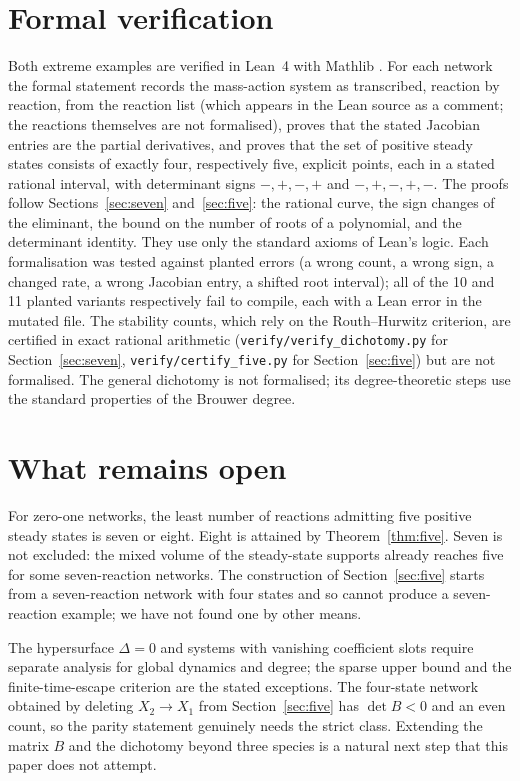 \documentclass[11pt]{article}
\theoremstyle{remark}\newtheorem{remark}[theorem]{Remark}
\begin{document}
\section{Formal verification}
Both extreme examples are verified in Lean~4 with Mathlib \cite{Lean4,Mathlib}.
For each network the formal statement records the mass-action system as transcribed, reaction by reaction,
from the reaction list (which appears in the Lean source as a comment; the reactions themselves are not
formalised), proves that the stated Jacobian entries are the partial
derivatives, and proves that the set of positive steady states consists of
exactly four, respectively five, explicit points, each in a stated rational
interval, with determinant signs $-,+,-,+$ and $-,+,-,+,-$. The proofs follow
Sections~\ref{sec:seven} and~\ref{sec:five}: the rational curve, the sign changes of the
eliminant, the bound on the number of roots of a polynomial, and the determinant
identity. They use only the standard axioms of Lean's logic. Each formalisation
was tested against planted errors (a wrong count, a wrong sign, a changed rate, a
wrong Jacobian entry, a shifted root interval); all of the 10 and 11 planted
variants respectively fail to compile, each with a Lean error in the mutated file. The stability counts,
which rely on the Routh--Hurwitz criterion, are certified in exact rational arithmetic
(\texttt{verify/verify\_dichotomy.py} for Section~\ref{sec:seven}, \texttt{verify/certify\_five.py} for
Section~\ref{sec:five}) but are not formalised. The general dichotomy is not formalised; its degree-theoretic steps
use the standard properties of the Brouwer degree.

\section{What remains open}\label{sec:open}
For zero-one networks, the least number of reactions admitting five positive
steady states is seven or eight. Eight is attained by Theorem~\ref{thm:five}. Seven is not excluded: the
mixed volume of the steady-state supports already reaches five for some
seven-reaction networks. The construction of Section~\ref{sec:five} starts from a
seven-reaction network with four states and so cannot produce a seven-reaction
example; we have not found one by other means.

The hypersurface $\Delta=0$ and systems with vanishing coefficient slots require
separate analysis for global dynamics and degree; the sparse upper bound and the
finite-time-escape criterion are the stated exceptions. The four-state network
obtained by deleting $X_2\to X_1$ from Section~\ref{sec:five} has $\det B<0$ and an
even count, so the parity statement genuinely needs the strict class.
Extending the matrix $B$ and the dichotomy beyond three species is a natural
next step that this paper does not attempt.
\end{document}
